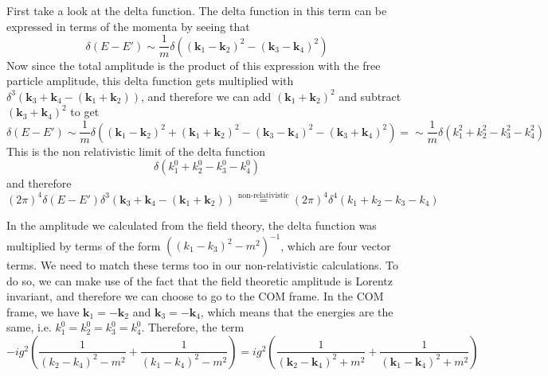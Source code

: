 \documentclass[11pt, notitlepage]{report}
\numberwithin{equation}{section}
\begin{document}
    First take a look at the delta function. The delta function in this term can be expressed in terms of the momenta by seeing that 
    \begin{equation*}
        \delta(E-E') \sim \frac{1}{m}\delta\left((\textbf{k}_1 - \textbf{k}_2)^2 - (\textbf{k}_3 - \textbf{k}_4)^2\right)
    \end{equation*} 
    Now since the total amplitude is the product of this expression with the free particle amplitude, this delta function gets multiplied with \(\delta^3(\textbf{k}_3 +  \textbf{k}_4 - (\textbf{k}_1 + \textbf{k}_2))\), and therefore we can add \((\textbf{k}_1 + \textbf{k}_2)^2\)   and subtract \((\textbf{k}_3 + \textbf{k}_4)^2\) to get 
    \begin{equation*}
        \delta(E-E') \sim \frac{1}{m}\delta\left((\textbf{k}_1 - \textbf{k}_2)^2 + (\textbf{k}_1 + \textbf{k}_2)^2 - (\textbf{k}_3 - \textbf{k}_4)^2 - (\textbf{k}_3 + \textbf{k}_4)^2\right) = \sim \frac{1}{m}\delta(k_1^2 + k_2^2 - k_3^2 - k_4^2)
    \end{equation*}
    This is the non relativistic limit of the delta function 
    \begin{equation*}
        \delta(k_1^0 + k_2^0 - k_3^0 - k_4^0)
    \end{equation*}
    and therefore 
    \begin{equation*}
         (2\pi)^4\delta(E-E')\delta^3(\textbf{k}_3 +  \textbf{k}_4 - (\textbf{k}_1 + \textbf{k}_2))\overset{\text{non-relativistic}}{=}(2\pi)^4\delta^4(k_1 + k_2 - k_3 - k_4) 
    \end{equation*}

    In the amplitude we calculated from the field theory, the delta function was multiplied by terms of the form \(((k_1 - k_3)^2 - m^2)^{-1}\), which are four vector terms. We need to match these terms too in our non-relativistic calculations. To do so, we can make use of the fact that the field theoretic amplitude is Lorentz invariant, and therefore we can choose to go to the COM frame. In the COM frame, we have \(\textbf{k}_1 = -\textbf{k}_2\) and \(\textbf{k}_3 = -\textbf{k}_4\), which means that the energies are the same, i.e. \(k_1^0 = k_2^0 = k_3^0 = k_4^0\). Therefore, the term
    \begin{equation*}
        -ig^2\left( \frac{1}{(k_2 - k_4)^2 - m^2} + \frac{1}{(k_1 - k_4)^2 - m^2 } \right) = ig^2\left( \frac{1}{(\textbf{k}_2 - \textbf{k}_4)^2 + m^2} + \frac{1}{(\textbf{k}_1 - \textbf{k}_4)^2 + m^2 } \right)
    \end{equation*}
\end{document}
